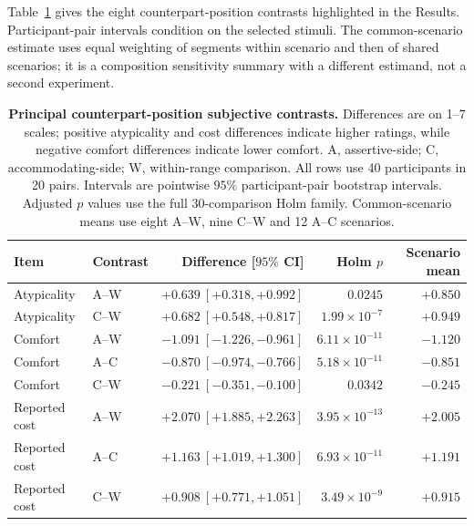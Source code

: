\documentclass[12pt,a4paper]{article}
\begin{document}
Table~\ref{tab:subjective_core} gives the eight counterpart-position contrasts highlighted in the
Results. Participant-pair intervals condition on the selected stimuli. The common-scenario estimate
uses equal weighting of segments within scenario and then of shared scenarios; it is a composition
sensitivity summary with a different estimand, not a second experiment.

\begin{table}[!htb]
\centering\small
\caption{\textbf{Principal counterpart-position subjective contrasts.}
Differences are on 1--7 scales; positive atypicality and cost differences indicate higher ratings,
while negative comfort differences indicate lower comfort. A, assertive-side; C, accommodating-side;
W, within-range comparison. All rows use 40 participants in 20 pairs. Intervals are pointwise
$95\%$ participant-pair bootstrap intervals. Adjusted $p$ values use the full 30-comparison Holm
family. Common-scenario means use eight A--W, nine C--W and 12 A--C scenarios.}
\label{tab:subjective_core}
\setlength{\tabcolsep}{4pt}
\begin{tabular}{llrrr}
\toprule
Item & Contrast & Difference [$95\%$ CI] & Holm $p$ & Scenario mean \\
\midrule
Atypicality & A--W & $+0.639\ [ +0.318,+0.992]$ & $0.0245$ & $+0.850$ \\
Atypicality & C--W & $+0.682\ [ +0.548,+0.817]$ & $1.99\!\times\!10^{-7}$ & $+0.949$ \\
Comfort & A--W & $-1.091\ [-1.226,-0.961]$ & $6.11\!\times\!10^{-11}$ & $-1.120$ \\
Comfort & A--C & $-0.870\ [-0.974,-0.766]$ & $5.18\!\times\!10^{-11}$ & $-0.851$ \\
Comfort & C--W & $-0.221\ [-0.351,-0.100]$ & $0.0342$ & $-0.245$ \\
Reported cost & A--W & $+2.070\ [ +1.885,+2.263]$ & $3.95\!\times\!10^{-13}$ & $+2.005$ \\
Reported cost & A--C & $+1.163\ [ +1.019,+1.300]$ & $6.93\!\times\!10^{-11}$ & $+1.191$ \\
Reported cost & C--W & $+0.908\ [ +0.771,+1.051]$ & $3.49\!\times\!10^{-9}$ & $+0.915$ \\
\bottomrule
\end{tabular}
\end{table}

\clearpage
\end{document}
